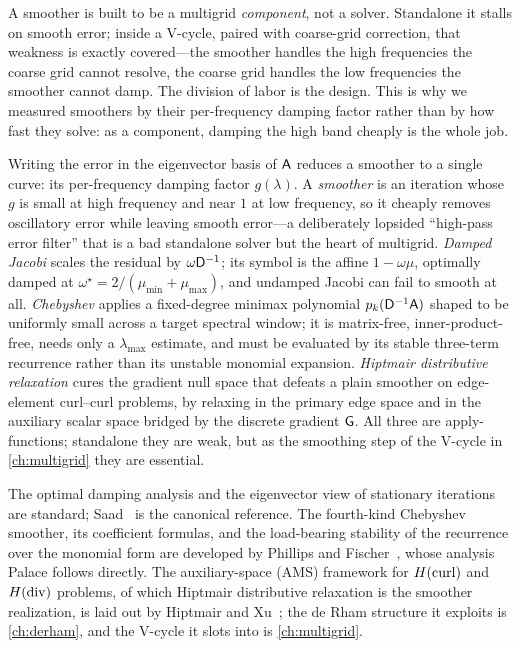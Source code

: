 \begin{keyidea}
A smoother is built to be a multigrid \emph{component}, not a solver. Standalone it
stalls on smooth error; inside a V-cycle, paired with coarse-grid correction, that
weakness is exactly covered---the smoother handles the high frequencies the coarse
grid cannot resolve, the coarse grid handles the low frequencies the smoother cannot
damp. The division of labor is the design. This is why we measured smoothers by
their per-frequency damping factor rather than by how fast they solve: as a
component, damping the high band cheaply is the whole job.
\end{keyidea}

\summarysection
Writing the error in the eigenvector basis of $\mathsf{A}$ reduces a smoother to a
single curve: its per-frequency damping factor $g(\lambda)$. A \emph{smoother} is an
iteration whose $g$ is small at high frequency and near $1$ at low frequency, so it
cheaply removes oscillatory error while leaving smooth error---a deliberately
lopsided ``high-pass error filter'' that is a bad standalone solver but the heart of
multigrid. \emph{Damped Jacobi} scales the residual by $\omega\mathsf{D}^{-1}$; its
symbol is the affine $1-\omega\mu$, optimally damped at
$\omega^\star=2/(\mu_{\min}+\mu_{\max})$, and undamped Jacobi can fail to smooth at
all. \emph{Chebyshev} applies a fixed-degree minimax polynomial $p_k(\mathsf{D}^{-1}\mathsf{A})$
shaped to be uniformly small across a target spectral window; it is matrix-free,
inner-product-free, needs only a $\lambda_{\max}$ estimate, and must be evaluated by
its stable three-term recurrence rather than its unstable monomial expansion.
\emph{Hiptmair distributive relaxation} cures the gradient null space that defeats a
plain smoother on edge-element curl--curl problems, by relaxing in the primary edge
space and in the auxiliary scalar space bridged by the discrete gradient $\mathsf{G}$.
All three are apply-functions; standalone they are weak, but as the smoothing step of
the V-cycle in \cref{ch:multigrid} they are essential.

\furtherreading
The optimal damping analysis and the eigenvector view of stationary iterations are
standard; Saad~\citep[Ch.~4]{saad2003} is the canonical reference. The fourth-kind
Chebyshev smoother, its coefficient formulas, and the load-bearing stability of the
recurrence over the monomial form are developed by Phillips and
Fischer~\citep{phillipsfischer2022}, whose analysis Palace follows directly. The
auxiliary-space (AMS) framework for $H(\mathrm{curl})$ and $H(\mathrm{div})$ problems, of which Hiptmair
distributive relaxation is the smoother realization, is laid out by Hiptmair and
Xu~\citep{hiptmairxu2007}; the de Rham structure it exploits is \cref{ch:derham},
and the V-cycle it slots into is \cref{ch:multigrid}.

